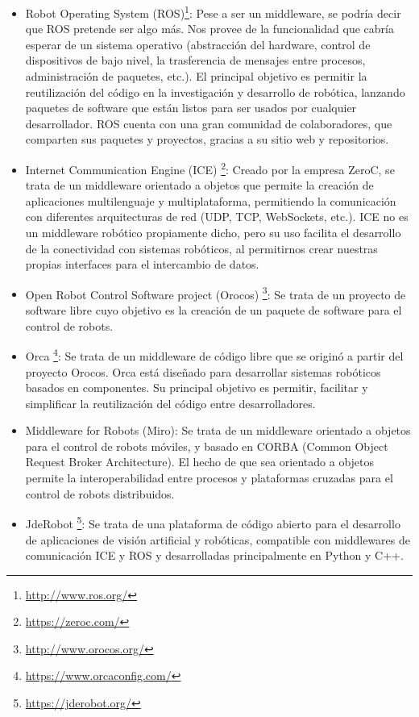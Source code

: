 \begin{itemize}
	\item Robot Operating System (ROS)\footnote{\url{http://www.ros.org/}}: Pese a ser un middleware, se podría decir que ROS pretende ser algo más. Nos provee de la funcionalidad que cabría esperar de un sistema operativo (abstracción del hardware, control de dispositivos de bajo nivel, la trasferencia de mensajes entre procesos, administración de paquetes, etc.). El principal objetivo es permitir la reutilización del código en la investigación y desarrollo de robótica, lanzando paquetes de software que están listos para ser usados por cualquier desarrollador. ROS cuenta con una gran comunidad de colaboradores, que comparten sus paquetes y proyectos, gracias a su sitio web y repositorios.
	\item Internet Communication Engine (ICE) \footnote{\url{https://zeroc.com/}}: Creado por la empresa ZeroC, se trata de un middleware orientado a objetos que permite la creación de aplicaciones multilenguaje y multiplataforma, permitiendo la comunicación con diferentes arquitecturas de red (UDP, TCP, WebSockets, etc.). ICE no es un middleware robótico propiamente dicho, pero su uso facilita el desarrollo de la conectividad con sistemas robóticos, al permitirnos crear nuestras propias interfaces para el intercambio de datos.
	\item Open Robot Control Software project (Orocos) \footnote{\url{http://www.orocos.org/}}: Se trata de un proyecto de software libre cuyo objetivo es la creación de un paquete de software para el control de robots.
	\item Orca \footnote{\url{https://www.orcaconfig.com/}}: Se trata de un middleware de código libre que se originó a partir del proyecto Orocos. Orca está diseñado para desarrollar sistemas robóticos basados en componentes. Su principal objetivo es permitir, facilitar y simplificar la reutilización del código entre desarrolladores.
	\item Middleware for Robots (Miro): Se trata de un middleware orientado a objetos para el control de robots móviles, y basado en CORBA (Common Object Request Broker Architecture). El hecho de que sea orientado a objetos permite la interoperabilidad entre procesos y plataformas cruzadas para el control de robots distribuidos.
	\item JdeRobot \footnote{\url{https://jderobot.org/}}: Se trata de una plataforma de código abierto para el desarrollo de aplicaciones de visión artificial y robóticas, compatible con middlewares de comunicación ICE y ROS y desarrolladas principalmente en Python y C++.
\end{itemize}

